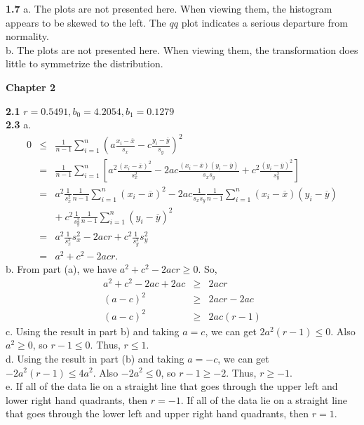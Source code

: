 \textbf{1.7} a. The plots are not presented here. When viewing them,
the histogram appears to be skewed to the left. The $qq$ plot
indicates a serious departure from normality.\\
b. The plots are not presented here. When viewing them, the
transformation does little to symmetrize the distribution.


\begin{center}\large \textbf{Chapter 2}\end{center}

\textbf{2.1}
$r=0.5491, b_0=4.2054, b_1=0.1279$\\

\textbf{2.3} a.\begin{eqnarray*} 0 & \leq &
\frac{1}{n-1}\sum_{i=1}^n\left( a\frac{x_i-\overline{x}}{s_{x}}-c
\frac{y_i-\overline{y}}{s_{y}}\right) ^{2} \\
&=&{\frac{1}{n-1}}\sum_{i=1}^n\left[a^2\frac{(x_i-\overline{x})^2}{s_{x}^2}
-2ac\frac{(x_i-\overline{x})(y_i-\overline{y})}{s_x s_{y}}+c^2\frac{(y_i-\overline{y})^2}{s_{y}^2} \right]\\
&=& a^2\frac{1}{s_x^2}\frac{1}{n-1}\sum_{i=1}^n\left(x_i-\overline{x}\right)^2-2ac\frac{1}{s_x s_y}\frac{1}{n-1}\sum_{i=1}^n\left(x_i-\overline{x}\right)\left(y_i-\overline{y}\right)\\
&&+~c^2\frac{1}{s_y^2}\frac{1}{n-1}\sum_{i=1}^n\left(y_i-\overline{y}\right)^2\\
&=&a^2\frac{1}{s_x^2}s_x^2-2acr+c^2\frac{1}{s_y^2}s_y^2\\
&=& a^{2}+c^{2}-2acr.
\end{eqnarray*}
b. From part (a), we have $a^{2}+c^{2}-2acr \geq 0$.
So,\begin{eqnarray*}
a^{2}+c^{2}-2ac+2ac &\geq& 2acr\\
(a-c)^2&\geq& 2acr-2ac\\
(a-c)^2&\geq& 2ac(r-1)
\end{eqnarray*}
c. Using the result in part b) and taking $a = c$, we can get $2a^{2}(r-1)\leq0$.
Also $a^2\geq 0$, so $r-1\leq 0$. Thus, $ r \leq 1$.\\
d. Using the result in part (b) and taking $a = -c$, we can get $-2a^{2}(r-1)\leq4a^2$.
Also $-2a^2\leq 0$, so $r-1\geq -2$. Thus, $r \geq -1$.\\
e. If all of the data lie on a straight line that goes through the
upper left and lower right hand quadrants, then $r=-1$.
If all of the data lie on a straight line that goes through the
lower left and upper right hand quadrants, then $r=1$.\\


